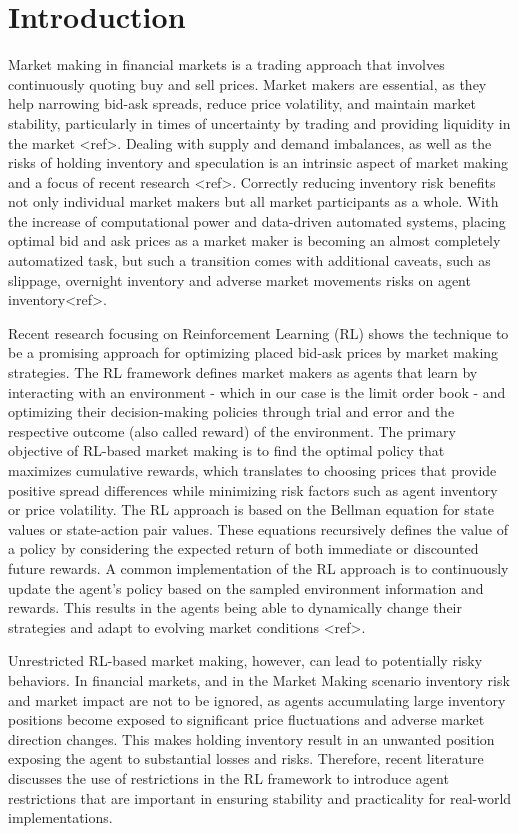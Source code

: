 \section{Introduction}
\label{sec:introduction}

Market making in financial markets is a trading approach that involves continuously quoting buy and sell prices.
Market makers are essential, as they help narrowing bid-ask spreads, reduce price volatility, and maintain market stability,
particularly in times of uncertainty by trading and providing liquidity in the market <ref>.
Dealing with supply and demand imbalances, as well as the risks of holding inventory and speculation is an intrinsic aspect of market making and a focus of recent research <ref>.
Correctly reducing inventory risk benefits not only individual market makers but all market participants as a whole.
With the increase of computational power and data-driven automated systems, placing optimal bid and ask prices as a market maker is becoming an almost completely automatized task,
but such a transition comes with additional caveats, such as slippage, overnight inventory and adverse market movements risks on agent inventory<ref>.

Recent research focusing on Reinforcement Learning (RL) shows the technique to be a promising approach for optimizing placed bid-ask prices by market making strategies.
The RL framework defines market makers as agents that learn by interacting with an environment - which in our case is the limit order book -
and optimizing their decision-making policies through trial and error and the respective outcome (also called reward) of the environment.
The primary objective of RL-based market making is to find the optimal policy that maximizes cumulative rewards,
which translates to choosing prices that provide positive spread differences while minimizing risk factors such as agent inventory or price volatility.
The RL approach is based on the Bellman equation for state values or state-action pair values.
These equations recursively defines the value of a policy by considering the expected return of both immediate or discounted future rewards.
A common implementation of the RL approach is to continuously update the agent's policy based on the sampled environment information and rewards.
This results in the agents being able to dynamically change their strategies and adapt to evolving market conditions <ref>.

Unrestricted RL-based market making, however, can lead to potentially risky behaviors.
In financial markets, and in the Market Making scenario inventory risk and market impact are not to be ignored,
as agents accumulating large inventory positions become exposed to significant price fluctuations and adverse market direction changes.
This makes holding inventory result in an unwanted position exposing the agent to substantial losses and risks.
Therefore, recent literature discusses the use of restrictions in the RL framework to introduce agent restrictions that are important in ensuring stability and practicality for real-world implementations.

